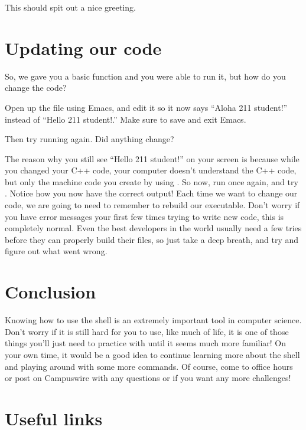 \documentclass{tufte-handout}
\begin{document}
\noindent
This should spit out a nice greeting.

\section{Updating our code}

So, we gave you a basic function and you were able to run it, but how do
you change the code?

Open up the  file using Emacs, and edit it so it
now says ``Aloha 211 student!'' instead of ``Hello 211 student!.'' Make
sure to save and exit Emacs.

Then try running  again. Did anything change?

The reason why you still see ``Hello 211 student!'' on your screen is
because while you changed your C++ code, your computer doesn't
understand the C++ code, but only the machine code you create by using
.  So now, run  once again, and
try . Notice how you now have the correct output!
Each time we want to change our code, we are going to need to remember
to rebuild our executable. Don't worry if you have error messages your
first few times trying to write new code, this is completely normal.
Even the best developers in the world usually need a few tries before
they can properly build their files, so just take a deep breath, and try
and figure out what went wrong.

\section{Conclusion}

Knowing how to use the shell is an extremely important tool in computer
science. Don't worry if it is still hard for you to use, like much of
life, it is one of those things you'll just need to practice with until
it seems much more familiar!  On your own time, it would be a good idea
to continue learning more about the shell and playing around with some
more commands.
Of course, come to office hours or post on Campuswire with any questions or
if you want any more challenges!

\section{Useful links}
\end{document}
